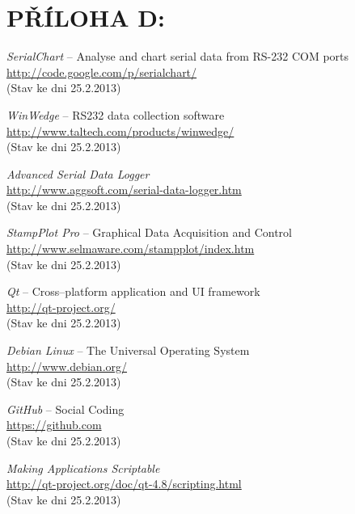 \documentclass[12pt, a4paper, oneside]{article}
\newcommand{\It}{\textit}  %
\begin{document}
 \section*{PŘÍLOHA D:}
 \begin{thebibliography}{99}

     \It{SerialChart} -- Analyse and chart serial data from RS-232 COM ports \\
    \url{http://code.google.com/p/serialchart/}\\
    (Stav ke dni 25.2.2013)

     \It{WinWedge} -- RS232 data collection software \\
    \url{http://www.taltech.com/products/winwedge/}\\
    (Stav ke dni 25.2.2013)

     \It{Advanced Serial Data Logger} \\
    \url{http://www.aggsoft.com/serial-data-logger.htm}\\
    (Stav ke dni 25.2.2013)

     \It{StampPlot Pro} -- Graphical Data Acquisition and Control \\
    \url{http://www.selmaware.com/stampplot/index.htm}\\
    (Stav ke dni 25.2.2013)

     \It{Qt} -- Cross--platform application and UI framework \\
    \url{http://qt-project.org/}\\
    (Stav ke dni 25.2.2013)

     \It{Debian Linux} -- The Universal Operating System \\
    \url{http://www.debian.org/}\\
    (Stav ke dni 25.2.2013)

     \It{GitHub} -- Social Coding \\
    \url{https://github.com}\\
    (Stav ke dni 25.2.2013)

     \It{Making Applications Scriptable} \\
    \url{http://qt-project.org/doc/qt-4.8/scripting.html}\\
    (Stav ke dni 25.2.2013)


\end{thebibliography}
\end{document}
